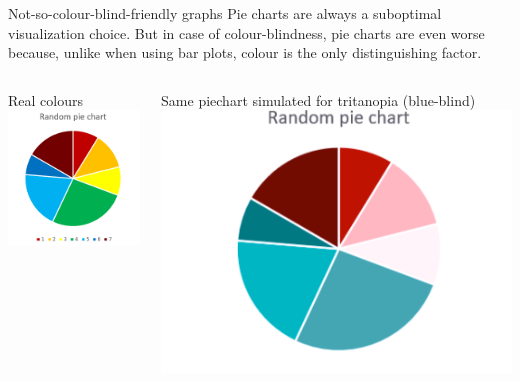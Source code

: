 \documentclass{beamer}
\begin{document}
\begin{frame}{Not-so-colour-blind-friendly graphs}
Pie charts are always a suboptimal visualization choice. But in case of colour-blindness, pie charts are even worse because, unlike when using bar plots, colour is the only distinguishing factor.

\begin{columns}[T]

    \begin{column}{.5\textwidth}
        \begin{block}{Real colours}
        \bigbreak
            \includegraphics[scale=0.6]{notcolourblindfriendlypiechart.png}
        \end{block}
    \end{column}

    \begin{column}{.5\textwidth}
        \begin{block}{Same piechart simulated for tritanopia (blue-blind)}
            \includegraphics[width=\textwidth]{simulatedpiechart.png}
        \end{block}
    \end{column}

\end{columns}

\end{frame}
\end{document}
